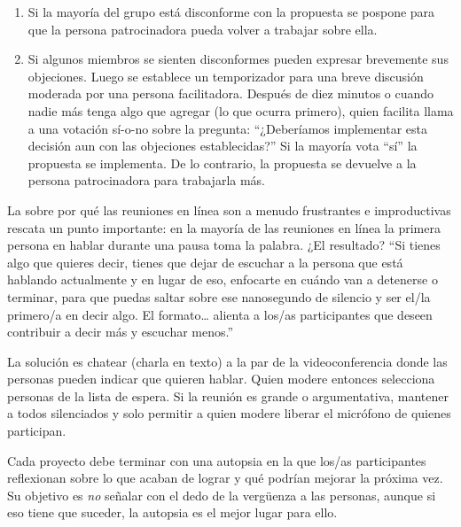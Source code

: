 \begin{enumerate}
\item
  Si la mayoría del grupo está disconforme con la propuesta
  se pospone para que la persona patrocinadora pueda volver a trabajar sobre ella.

\item
  Si algunos miembros se sienten disconformes pueden expresar brevemente sus objeciones.
  Luego se establece un temporizador para una breve discusión moderada por una persona facilitadora.
  Después de diez minutos o cuando nadie más tenga algo que agregar (lo que ocurra primero),
  quien facilita llama a una votación sí-o-no sobre la pregunta:
  ``¿Deberíamos implementar esta decisión aun con las objeciones establecidas?''
  Si la mayoría vota ``sí'' la propuesta se implementa.
  De lo contrario, la propuesta se devuelve a la persona patrocinadora para trabajarla más.

\end{enumerate}


La 
sobre por qué las reuniones en línea son a menudo frustrantes e improductivas 
rescata un punto importante:
en la mayoría de las reuniones en línea
la primera persona en hablar durante una pausa toma la palabra.
¿El resultado?
``Si tienes algo que quieres decir,
tienes que dejar de escuchar a la persona que está hablando actualmente
y en lugar de eso, enfocarte en cuándo van a detenerse o terminar, 
para que puedas saltar sobre ese nanosegundo de silencio y ser el/la primero/a en decir algo.
El formato{\ldots} alienta a los/as participantes que deseen contribuir a decir más y escuchar menos.''

La solución es chatear (charla en texto) a la par de la videoconferencia
donde las personas pueden indicar que quieren hablar.
Quien modere entonces selecciona personas de la lista de espera.
Si la reunión es grande o argumentativa,
mantener a todos silenciados
y solo permitir a quien modere liberar el micrófono de quienes participan.


Cada proyecto debe terminar con una autopsia
en la que los/as participantes reflexionan sobre lo que acaban de lograr
y qué podrían mejorar la próxima vez.
Su objetivo es \emph{no} señalar con el dedo de la vergüenza a las personas,
aunque si eso tiene que suceder,
la autopsia es el mejor lugar para ello.

